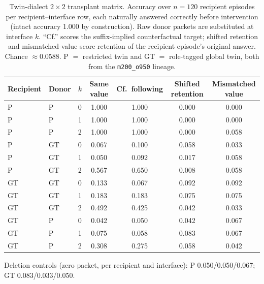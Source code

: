 \documentclass[11pt]{article}
\newcommand{\ckpt}[1]{\texttt{#1}}
\begin{document}
\begin{table}[t]
\centering
\small
\caption{Twin-dialect $2\times2$ transplant matrix. Accuracy over $n=120$ recipient episodes per recipient--interface row, each naturally answered correctly before intervention (intact accuracy 1.000 by construction). Raw donor packets are substituted at interface $k$. ``Cf.'' scores the suffix-implied counterfactual target; shifted retention and mismatched-value score retention of the recipient episode's original answer. Chance $\approx0.0588$. P $=$ restricted twin and GT $=$ role-tagged global twin, both from the \ckpt{m200\_o950} lineage.}
\label{tab:twins}
\begin{tabular}{llccccc}
\toprule
Recipient & Donor & $k$ & Same value & Cf.\ following & Shifted retention & Mismatched value \\
\midrule
P  & P  & 0 & 1.000 & 1.000 & 0.000 & 0.000 \\
P  & P  & 1 & 1.000 & 1.000 & 0.000 & 0.000 \\
P  & P  & 2 & 1.000 & 1.000 & 0.000 & 0.058 \\
P  & GT & 0 & 0.067 & 0.100 & 0.058 & 0.033 \\
P  & GT & 1 & 0.050 & 0.092 & 0.017 & 0.058 \\
P  & GT & 2 & 0.567 & 0.650 & 0.008 & 0.058 \\
GT & GT & 0 & 0.133 & 0.067 & 0.092 & 0.092 \\
GT & GT & 1 & 0.183 & 0.183 & 0.075 & 0.075 \\
GT & GT & 2 & 0.492 & 0.425 & 0.042 & 0.033 \\
GT & P  & 0 & 0.042 & 0.050 & 0.042 & 0.067 \\
GT & P  & 1 & 0.075 & 0.058 & 0.083 & 0.067 \\
GT & P  & 2 & 0.308 & 0.275 & 0.058 & 0.042 \\
\bottomrule
\end{tabular}

\smallskip
\raggedright\footnotesize Deletion controls (zero packet, per recipient and interface): P 0.050/0.050/0.067; GT 0.083/0.033/0.050.
\end{table}
\end{document}
